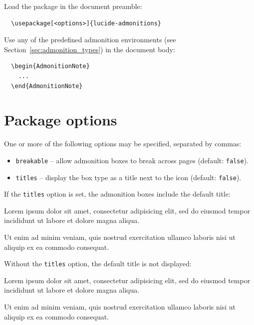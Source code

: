 \documentclass{scrartcl}
\begin{document}
Load the package in the document preamble:

\begin{verbatim}
  \usepackage[<options>]{lucide-admonitions}
\end{verbatim}

Use any of the predefined admonition environments
(see Section~\ref{sec:admonition_types}) in the document body:

\begin{verbatim}
  \begin{AdmonitionNote}
    ...
  \end{AdmonitionNote}
\end{verbatim}


\section{Package options}\label{sec:options}

One or more of the following options may be specified, separated by commas:

\begin{itemize}
\item \texttt{breakable} -- allow admonition boxes to break across pages (default: \texttt{false}).
\item \texttt{titles} -- display the box type as a title next to the icon (default: \texttt{false}).
\end{itemize}

If the \texttt{titles} option is set, the admonition boxes include the default
title:

\begin{AdmonitionExample}[Example]
Lorem ipsum dolor sit amet, consectetur adipisicing elit, sed do eiusmod
tempor incididunt ut labore et dolore magna aliqua.

Ut enim ad minim veniam, quis nostrud exercitation ullamco laboris nisi ut
aliquip ex ea commodo consequat.
\end{AdmonitionExample}

Without the \texttt{titles} option, the default title is not displayed:

\begin{AdmonitionExample}[]
Lorem ipsum dolor sit amet, consectetur adipisicing elit, sed do eiusmod
tempor incididunt ut labore et dolore magna aliqua.

Ut enim ad minim veniam, quis nostrud exercitation ullamco laboris nisi ut
aliquip ex ea commodo consequat.
\end{AdmonitionExample}
\end{document}
